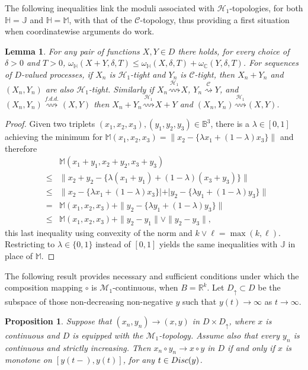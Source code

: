 \documentclass[final]{amsart}
\newtheorem{lem}[thm]{Lemma}
\newtheorem{prop}[thm]{Proposition}
\theoremstyle{definition}
\numberwithin{equation}{section}
\def\disp{\displaystyle}
\newcommand{\dB}{\ensuremath{\mathbb{B}}}
\newcommand{\dC}{\ensuremath{\mathbb{C}}}
\newcommand{\dH}{\ensuremath{\mathbb{H}}}
\newcommand{\dJ}{\ensuremath{\mathbb{J}}}
\newcommand{\dM}{\ensuremath{\mathbb{M}}}
\newcommand{\dR}{\ensuremath{\mathbb{R}}}
\newcommand{\cM}{\ensuremath{\mathcal{M}}}
\begin{document}
The following inequalities link the moduli associated with $\mathcal{H}_1$-topologies,
for both $\dH=\dJ$ and $\dH=\dM$, with that of the $\mathcal{C}$-topology,
thus providing a first situation when coordinatewise arguments do work.

\begin{lem}\label{lem:BasicInequality}
For any pair of functions $X, Y\in D$ there holds, for every choice of $\delta>0$ and $T>0$,
$\omega_\dH(X+Y,\delta,T)\le \omega_\dH(X,\delta,T)+\omega_\dC(Y,\delta,T)$.
For sequences of $D$-valued processes, if $X_n$ is $\mathcal{H}_1$-tight and
$Y_n$ is $\mathcal{C}$-tight, then $X_n+Y_n$ and $(X_n,Y_n)$ are also $\mathcal{H}_1$-tight.
Similarly if $X_n\stackrel{\mathcal{H}_1}{\rightsquigarrow} X$, $Y_n\stackrel{\mathcal{C}}{\rightsquigarrow} Y$, and
$(X_n,Y_n)\stackrel{f.d.d.}{\rightsquigarrow} (X,Y)$ then $X_n+Y_n\stackrel{\mathcal{H}_1}{\rightsquigarrow} X+Y$
and $(X_n,Y_n)\stackrel{\mathcal{H}_1}{\rightsquigarrow}(X,Y)$.
\end{lem}

\begin{proof} Given two triplets $(x_1,x_2,x_3), (y_1,y_2,y_3)\in \dB^3$, there is a $\lambda\in[0,1]$ achieving the minimum for
$\dM(x_1,x_2,x_3)=\|x_2-\{\lambda x_1+(1-\lambda)x_3\}\|$ and therefore
\begin{eqnarray*}
& & \dM(x_1+y_1,x_2+y_2,x_3+y_3) \\
& \le & \|x_2+y_2-\{\lambda (x_1+y_1)+(1-\lambda)(x_3+y_3)\}\| \\
& \le & \|x_2-\{\lambda x_1+(1-\lambda)x_3\}| + |y_2-\{\lambda y_1+(1-\lambda)y_3\}\| \\
& = & \dM(x_1,x_2,x_3) +  \|y_2-\{\lambda y_1+(1-\lambda)y_3\}\| \\
& \le& \dM(x_1,x_2,x_3) +  \|y_2-y_1\| \vee \|y_2-y_3\|,
\end{eqnarray*}
this last inequality using convexity of the norm and $k\vee\ell = \max(k,\ell)$.
Restricting to $\lambda\in\{0,1\}$ instead of $[0,1]$ yields the same inequalities with $\dJ$ in place of $\dM$.
\end{proof}

The following result provides necessary and sufficient conditions under which the
composition mapping $\circ$ is $\mathcal{M}_1$-continuous, when $B=\dR^k$.
Let $D_{\uparrow}\subset D$ be the subspace of those non-decreasing non-negative $y$ such that $y(t) \to\infty$ as $t\to\infty$.

\begin{prop}\label{prop:Whitt_composition}
Suppose that $(x_n, y_n) \stackrel{}{\to} (x, y) $ in $D \times  D_{\uparrow}$, where $x$ is continuous and $D$ is equipped with the
$\cM_1$-topology. Assume also that every $y_n$ is continuous and strictly increasing.
Then $\disp x_n \circ y_n \stackrel{}{\to}  x\circ  y$ in $D$ if and only if $x$ is monotone on $[y(t-), y(t)]$,
for any $t\in {\rm Disc}(y)$.
\end{prop}
\end{document}
